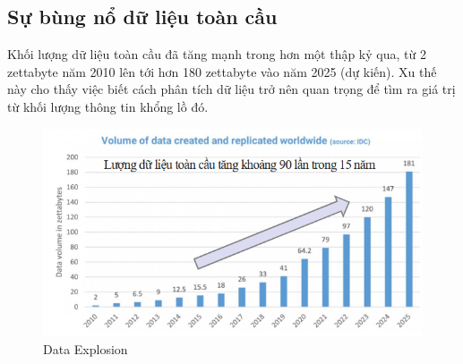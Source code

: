 \documentclass[11pt]{article}
\begin{document}
\subsection{Sự bùng nổ dữ liệu toàn cầu}
Khối lượng dữ liệu toàn cầu đã tăng mạnh trong hơn một thập kỷ qua, từ 2 zettabyte năm 2010 lên tới hơn 180 zettabyte vào năm 2025 (dự kiến). Xu thế này cho thấy việc biết cách phân tích dữ liệu trở nên quan trọng để tìm ra giá trị từ khối lượng thông tin khổng lồ đó.

\begin{figure}[H]
    \centering
    \includegraphics[width=1\linewidth]{images/dataExplosion.png}
    \caption{Data Explosion}
    \label{fig:dataExplosion}
\end{figure}
\end{document}
